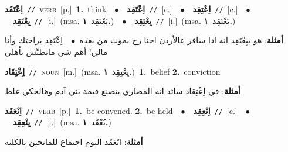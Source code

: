 \documentclass[10pt,a4paper,twoside]{article} %
\begin{document}
\begin{multicols}{2}
{\setlength\topsep{0pt}\textbf{\foreignlanguage{arabic}{اِعْتَقَد}}\ {\color{gray}\texttt{//}\color{black}}\ \textsc{verb}\ [p.]\ \textbf{1.}~think\ \ $\bullet$\ \ \setlength\topsep{0pt}\textbf{\foreignlanguage{arabic}{اِعْتَقِد}}\ {\color{gray}\texttt{//}\color{black}}\ [c.]\ \ $\bullet$\ \ \setlength\topsep{0pt}\textbf{\foreignlanguage{arabic}{اِعْتِقِد}}\ {\color{gray}\texttt{//}\color{black}}\ [c.]\ \ $\bullet$\ \ \setlength\topsep{0pt}\textbf{\foreignlanguage{arabic}{يِعْتَقِد}}\ {\color{gray}\texttt{//}\color{black}}\ [i.]\ \color{gray}(msa. \foreignlanguage{arabic}{يَعْتَقِد}~\foreignlanguage{arabic}{\textbf{١.}})\color{black}\ \ $\bullet$\ \ \setlength\topsep{0pt}\textbf{\foreignlanguage{arabic}{يِعْتِقِد}}\ {\color{gray}\texttt{//}\color{black}}\ [i.]\ \color{gray}(msa. \foreignlanguage{arabic}{يَعْتَقِد}~\foreignlanguage{arabic}{\textbf{١.}})\color{black}\  \begin{flushright}\color{gray}\foreignlanguage{arabic}{\textbf{\underline{\foreignlanguage{arabic}{أمثلة}}}: هو بيِعْتَقِد انه اذا سافر عالأردن احنا رح نموت من بعده\ $\bullet$\ \  اِعْتَقِد براحتك وأنا مالي! أهم شي ماتطبِّش بأهلي}\end{flushright}\color{black}} \vspace{2mm}

{\setlength\topsep{0pt}\textbf{\foreignlanguage{arabic}{اِعْتِقَاد}}\ {\color{gray}\texttt{//}\color{black}}\ \textsc{noun}\ [m.]\ \color{gray}(msa. \foreignlanguage{arabic}{يِعْتِقِد}~\foreignlanguage{arabic}{\textbf{١.}})\color{black}\ \textbf{1.}~belief  \textbf{2.}~conviction\  \begin{flushright}\color{gray}\foreignlanguage{arabic}{\textbf{\underline{\foreignlanguage{arabic}{أمثلة}}}: في اِعْتِقاد سائد انه المصاري بتصنع قيمة بني آدم وهالحكي غلط}\end{flushright}\color{black}} \vspace{2mm}

{\setlength\topsep{0pt}\textbf{\foreignlanguage{arabic}{اِنْعَقَد}}\ {\color{gray}\texttt{//}\color{black}}\ \textsc{verb}\ [p.]\ \textbf{1.}~be convened.  \textbf{2.}~be held\ \ $\bullet$\ \ \setlength\topsep{0pt}\textbf{\foreignlanguage{arabic}{اِنْعِقِد}}\ {\color{gray}\texttt{//}\color{black}}\ [c.]\ \ $\bullet$\ \ \setlength\topsep{0pt}\textbf{\foreignlanguage{arabic}{يِنْعِقِد}}\ {\color{gray}\texttt{//}\color{black}}\ [i.]\ \color{gray}(msa. \foreignlanguage{arabic}{يُعْقَد}~\foreignlanguage{arabic}{\textbf{١.}})\color{black}\  \begin{flushright}\color{gray}\foreignlanguage{arabic}{\textbf{\underline{\foreignlanguage{arabic}{أمثلة}}}: انْعَقَد اليوم اجتماع للمانحين بالكلية}\end{flushright}\color{black}} \vspace{2mm}


\end{multicols}
\end{document}
